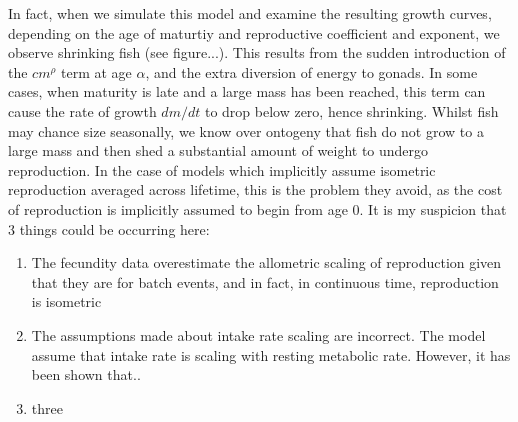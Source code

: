 \documentclass[a4paper]{article} %
\begin{document}
            In fact, when we simulate this model and examine the resulting growth curves, depending on the age of maturtiy and reproductive coefficient and exponent, we observe shrinking fish (see figure...). This results from the sudden introduction of the $cm^{\rho}$ term at age $\alpha$, and the extra diversion of energy to gonads. In some cases, when maturity is late and a large mass has been reached, this term can cause the rate of growth $dm/dt$ to drop below zero, hence shrinking. Whilst fish may chance size seasonally, we know over ontogeny that fish do not grow to a large mass and then shed a substantial amount of weight to undergo reproduction. In the case of models which implicitly assume isometric reproduction averaged across lifetime, this is the problem they avoid, as the cost of reproduction is implicitly assumed to begin from age 0. It is my suspicion that 3 things could be occurring here:
            \begin{enumerate}
                \item The fecundity data \autocite{Barneche2018d} overestimate the allometric scaling of reproduction given that they are for batch events, and in fact, in continuous time, reproduction is isometric
                \item The assumptions made about intake rate scaling are incorrect. The \cite{West2001} model assume that intake rate is scaling with resting metabolic rate. However, it has been shown that..
                \item three
            \end{enumerate}
\end{document}
